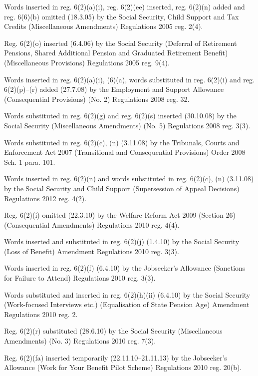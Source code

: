 \documentclass[12pt,a4paper]{article}
\begin{document}
{Words inserted in reg. 6(2)(a)(i), reg. 6(2)(ee) inserted, reg. 6(2)(n) added and reg. 6(6)(b) omitted (18.3.05) by the Social Security, Child Support and Tax Credits (Miscellaneous Amendments) Regulations 2005 reg. 2(4).

Reg. 6(2)(o) inserted (6.4.06) by the Social Security (Deferral of Retirement Pensions, Shared Additional Pension and Graduated Retirement Benefit) (Miscellaneous Provisions) Regulations 2005 reg. 9(4).

\begin{sloppypar}
Words inserted in reg. 6(2)(a)(i), (6)(a), words substituted in reg. 6(2)(i) and reg. 6(2)(p)--(r) added (27.7.08) by the Employment and Support Allowance (Consequential Provisions) (No. 2) Regulations 2008 reg. 32.
\end{sloppypar}

Words substituted in reg. 6(2)(g) and reg. 6(2)(s) inserted (30.10.08) by the Social Security (Miscellaneous Amendments) (No. 5) Regulations 2008 reg. 3(3).

Words substituted in reg. 6(2)(c), (n) (3.11.08) by the Tribunals, Courts and Enforcement Act 2007 (Transitional and Consequential Provisions) Order 2008 Sch. 1 para. 101.

Words inserted in reg. 6(2)(n) and words substituted in reg. 6(2)(c), (n) (3.11.08) by the Social Security and Child Support (Supersession of Appeal Decisions) Regulations 2012 reg. 4(2).

Reg. 6(2)(i) omitted (22.3.10) by the Welfare Reform Act 2009 (Section 26) (Consequential Amendments) Regulations 2010 reg. 4(4).

Words inserted and substituted in reg. 6(2)(j) (1.4.10) by the Social Security (Loss of Benefit) Amendment Regulations 2010 reg. 3(3).

Words inserted in reg. 6(2)(f) (6.4.10) by the Jobseeker’s Allowance (Sanctions for Failure to Attend) Regulations 2010 reg. 3(3).

Words substituted and inserted in reg. 6(2)(h)(ii) (6.4.10) by the Social Security (Work-focused Interviews etc.) (Equalisation of State Pension Age) Amendment Regulations 2010 reg. 2.

Reg. 6(2)(r) substituted (28.6.10) by the Social Security (Miscellaneous Amendments) (No. 3) Regulations 2010 reg. 7(3).

Reg. 6(2)(fa) inserted temporarily (22.11.10--21.11.13) by the Jobseeker’s Allowance (Work for Your Benefit Pilot Scheme) Regulations 2010 reg. 20(b).

}
\end{document}
